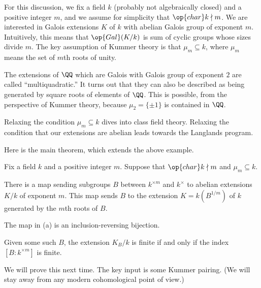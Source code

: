 \documentclass[../notes.tex]{subfiles}
\begin{document}
For this discussion, we fix a field $k$ (probably not algebraically closed) and a positive integer $m$, and we assume for simplicity that $\op{char}k\nmid m$. We are interested in Galois extensions $K$ of $k$ with abelian Galois group of exponent $m$. Intuitively, this means that $\op{Gal}(K/k)$ is sum of cyclic groups whose sizes divide $m$. The key assumption of Kummer theory is that $\mu_m\subseteq k$, where $\mu_m$ means the set of $m$th roots of unity.
\begin{example}
	The extensions of $\QQ$ which are Galois with Galois group of exponent $2$ are called ``multiquadratic.'' It turns out that they can also be described as being generated by square roots of elements of $\QQ$. This is possible, from the perspective of Kummer theory, because $\mu_2=\{\pm1\}$ is contained in $\QQ$.
\end{example}
\begin{remark}
	Relaxing the condition $\mu_m\subseteq k$ dives into class field theory. Relaxing the condition that our extensions are abelian leads towards the Langlands program.
\end{remark}
Here is the main theorem, which extends the above example.
\begin{theorem}[Kummer]
	Fix a field $k$ and a positive integer $m$. Suppose that $\op{char}k\nmid m$ and $\mu_m\subseteq k$.
	\begin{listalph}
		\item There is a map sending subgroups $B$ between $k^{\times m}$ and $k^\times$ to abelian extensions $K/k$ of exponent $m$. This map sends $B$ to the extension $K=k(B^{1/m})$ of $k$ generated by the $m$th roots of $B$.
		\item The map in (a) is an inclusion-reversing bijection.
		\item Given some such $B$, the extension $K_B/k$ is finite if and only if the index $\left[B:k^{\times m}\right]$ is finite.
	\end{listalph}
\end{theorem}
We will prove this next time. The key input is some Kummer pairing. (We will stay away from any modern cohomological point of view.)
\end{document}
